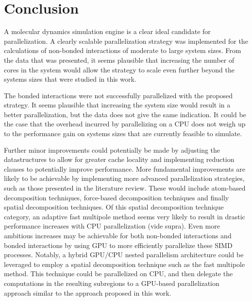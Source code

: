 \documentclass[conference]{IEEEtran}
\begin{document}
\section{Conclusion}
A molecular dynamics simulation engine is a clear ideal candidate for parallelization. A clearly scalable
parallelization strategy was implemented for the calculations of non-bonded interactions of moderate to large system 
sizes. From the data that was presented, it seems plausible that increasing the number of cores in the system would 
allow the strategy to scale even further beyond the systems sizes that were studied in this work. 

The bonded
interactions were not successfully parallelized with the proposed strategy. It seems plausible that increasing
the system size would result in a better parallelization, but the data does not give the same indication. It could be 
the case that the overhead incurred by parallelizing on a CPU does not weigh up to the performance gain on 
systems sizes that are currently feasible to simulate.

Further minor improvements
could potentially be made by adjusting the datastructures to allow for greater cache locality and implementing reduction clauses
to potentially improve performance. More fundamental improvements are likely to be achievable by implementing more
advanced parallelization strategies, such as those presented in the literature review. These would include atom-based
decomposition techniques, force-based decomposition techniques and finally spatial decomposition techniques.
Of this spatial decomposition technique category, an adaptive
fast multipole method seems very likely to result in drastic performance increases with CPU parallelization (vide supra).
Even more ambitious increases may be achievable for both non-bonded interactions and bonded interactions 
by using GPU to more efficiently parallelize these SIMD processes. Notably, a hybrid GPU/CPU 
nested parallelism architecture could be
leveraged to employ a spatial decomposition technique such as the fast multipole method. This technique could be
parallelized on CPU, and then delegate the computations in the resulting subregions to a GPU-based parallelization
approach similar to the approach proposed in this work.




\end{document}
